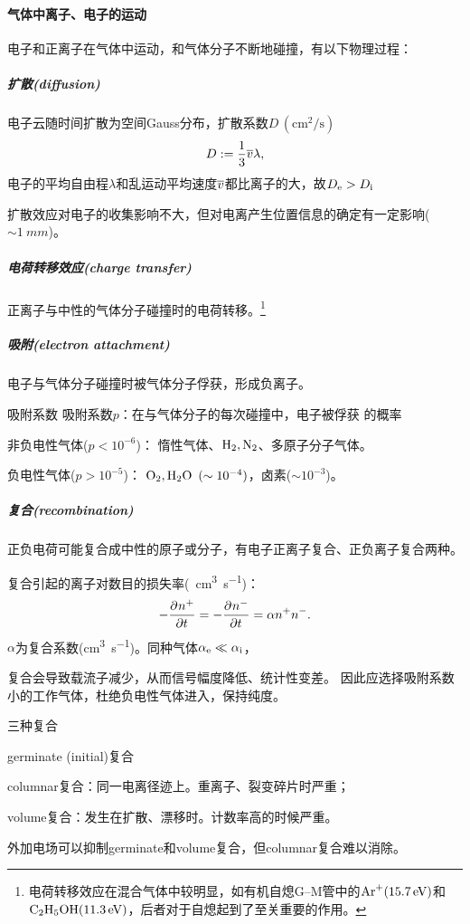 \paragraph{气体中离子、电子的运动}
电子和正离子在气体中运动，和气体分子不断地碰撞，有以下物理过程：
\subparagraph{扩散(diffusion)}
电子云随时间扩散为空间Gauss分布，扩散系数$D\,(\unit{\centi\metre\squared\per\second})$
\begin{equation}\label{eq:nrd-diffusion-coefficient}
	D := \frac13\overline{v}\lambda,
\end{equation}
电子的平均自由程$\lambda$和乱运动平均速度$\overline{v}$都比离子的大，故$D_{\mathrm{e}} > D_{\mathrm i}$

扩散效应对电子的收集影响不大，但对电离产生位置信息的确定有一定影响($\sim \qty{1}{mm}$)。
\subparagraph{电荷转移效应(charge transfer)}
正离子与中性的气体分子碰撞时的电荷转移。\footnote{电荷转移效应在混合气体中较明显，如有机自熄G--M管中的$\mathrm{Ar}^+(\qty{15.7}{eV})$和$\mathrm{C_2H_5OH}(\qty{11.3}{eV})$，后者对于自熄起到了至关重要的作用。}

\subparagraph{吸附(electron attachment)}
电子与气体分子碰撞时被气体分子俘获，形成负离子。
\begin{definition}{吸附系数}{}
	吸附系数$p$：在与气体分子的每次碰撞中，电子被俘获%
	的概率%
	\begin{compactitem}
		\item 非负电性气体($p < 10^{-6}$)：
		惰性气体、$\mathrm{H}_2,\mathrm{N}_2$、多原子分子气体。
		\item 负电性气体($p > 10^{-5}$)：
		$\mathrm{O_2,H_2O}\enspace (\sim 10^{-4})$，卤素($\sim 10^{-3}$)。
	\end{compactitem}
\end{definition}
\subparagraph{复合(recombination)}
正负电荷可能复合成中性的原子或分子，有电子正离子复合、正负离子复合两种。

复合引起的离子对数目的损失率(\unit{\per\centi\metre\cubed\per\second})：
\begin{equation}\label{eq:nrd-ion-recombination}
	- \frac{\partial^{}n^+}{\partial{t}^{}} = -\frac{\partial^{}n^-}{\partial{t}^{}} = \alpha n^+n^-.
\end{equation}
$\alpha$为复合系数(\unit{\centi\metre\cubed\per\second})。同种气体$\alpha_{\mathrm{e}} \ll \alpha_{\mathrm i}$，

复合会导致载流子减少，从而信号幅度降低、统计性变差。%
因此应选择吸附系数小的工作气体，杜绝负电性气体进入，保持纯度。
\begin{definition}{三种复合}{}
	\begin{compactitem}
		\item germinate (initial)复合
		\item columnar复合：同一电离径迹上。重离子、裂变碎片时严重；
		\item volume复合：发生在扩散、漂移时。计数率高的时候严重。
	\end{compactitem}
\end{definition}
\noindent
外加电场可以抑制germinate和volume复合，但columnar复合难以消除。


